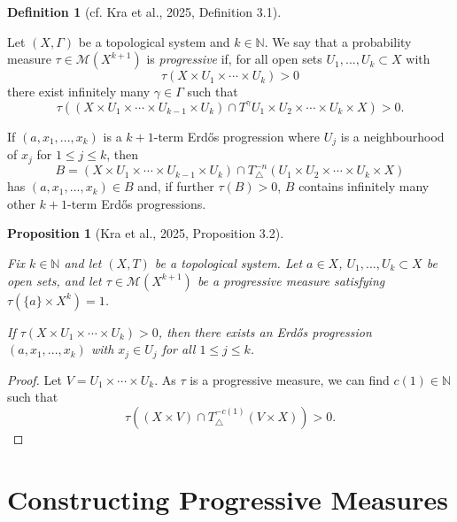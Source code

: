 \documentclass[
  british,
]{article}
\theoremstyle{plain}
\newtheorem{proposition}{Proposition}[section]
\theoremstyle{plain}
\theoremstyle{plain}
\theoremstyle{definition}
\newtheorem{definition}{Definition}[section]
\theoremstyle{remark}
\newcommand{\Group}{{\Gamma}}
\newcommand{\GroupAction}[2]{T^{#1}{#2}}
\newcommand{\GroupElement}{{\gamma}}
\begin{document}
\begin{definition}[{cf. Kra et al., 2025, Definition
3.1}]\protect\hypertarget{def-ProgressiveCubicMeasure}{}\label{def-ProgressiveCubicMeasure}

Let \((X,\Group)\) be a topological system and \(k\in\mathbb{N}\). We
say that a probability measure \(\tau\in\mathcal{M}(X^{k+1})\) is
\emph{progressive} if, for all open sets \(U_1,...,U_k\subset X\) with
\[\tau(X\times U_1\times\cdots\times U_k)>0 \] there exist infinitely
many \(\GroupElement\in\Group\) such that
\[\tau((X\times U_1\times\cdots\times U_{k-1}\times U_k)\cap \GroupAction{\GroupElement}{U_1\times U_2\times\cdots\times U_k\times X})>0. \]

\end{definition}

If \((a,x_1,...,x_k)\) is a \(k+1\)-term Erdős progression where \(U_j\)
is a neighbourhood of \(x_j\) for \(1\leq j\leq k\), then
\[B=(X\times U_1\times\cdots\times U_{k-1}\times U_k)\cap T_{\triangle}^{-n}(U_1\times U_2\times\cdots\times U_k\times X)\]
has \((a,x_1,...,x_k)\in B\) and, if further \(\tau(B)>0\), \(B\)
contains infinitely many other \(k+1\)-term Erdős progressions.

\begin{proposition}[{Kra et al., 2025, Proposition
3.2}]\protect\hypertarget{prp-ProgressiveMeasureErdosExistence}{}\label{prp-ProgressiveMeasureErdosExistence}

Fix \(k\in\mathbb{N}\) and let \((X,T)\) be a topological system. Let
\(a\in X\), \(U_1,...,U_k\subset X\) be open sets, and let
\(\tau\in\mathcal{M}(X^{k+1})\) be a progressive measure satisfying
\(\tau(\{a\}\times X^k)=1\).

If \(\tau(X\times U_1\times\cdots\times U_k)>0\), then there exists an
Erdős progression \((a,x_1,...,x_k)\) with \(x_j\in U_j\) for all
\(1\leq j\leq k\).

\end{proposition}

\begin{proof}
Let \(V=U_1\times\cdots\times U_k\). As \(\tau\) is a progressive
measure, we can find \(c(1)\in\mathbb{N}\) such that
\[\tau((X\times V)\cap T_{\triangle}^{-c(1)}(V\times X))>0. \]
\end{proof}

\section{Constructing Progressive
Measures}\label{constructing-progressive-measures}
\end{document}
